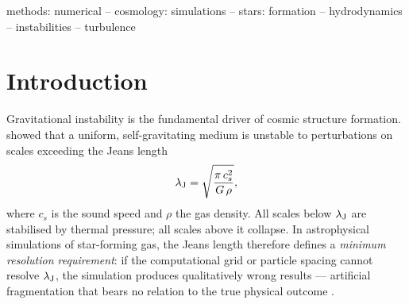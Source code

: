 \documentclass[fleqn,usenatbib]{mnras}
\newcommand{\lJ}{\lambda_{\rm J}}
\begin{document}
\begin{abstract}
$\Delta r_{\rm proper}$ throughout cosmic time by dynamically
adjusting the refinement threshold, smoothing the Poisson source in
transition levels, and raising the Jeans pressure floor to match the
effective resolution.  In a $1024^3$ zoom-in test, FPR reduces peak
memory usage from $>$99\,per\,cent (OOM crash at $z\approx2.5$) to
$\sim$54\,per\,cent while matching the observed star formation rate
density to within 30\,per\,cent of the \citet{MadauDickinson2014}
fit, demonstrating that FPR enables cosmological runs to reach $z=0$
without memory overflow.
Finally, we identify a secondary
failure mode when the holdback is disabled --- negative internal energy
from the total-energy formulation in post-feedback flows --- and
introduce a minimal \emph{eEOS polytropic energy floor} that prevents
CFL time-step collapse without altering the thermodynamics of diffuse
gas.
\end{abstract}

\begin{keywords}
methods: numerical -- cosmology: simulations --
stars: formation -- hydrodynamics -- instabilities --
turbulence
\end{keywords}


\section{Introduction}
\label{sec:intro}

Gravitational instability is the fundamental driver of cosmic
structure formation.  \citet{Jeans1902} showed that a uniform,
self-gravitating medium is unstable to perturbations on scales
exceeding the Jeans length
\begin{equation}
  \lJ = \sqrt{\frac{\pi\,c_s^2}{G\,\rho}},
  \label{eq:jeans_intro}
\end{equation}
where $c_s$ is the sound speed and $\rho$ the gas density.  All
scales below $\lJ$ are stabilised by thermal pressure; all scales
above it collapse.  In astrophysical simulations of star-forming gas,
the Jeans length therefore defines a \emph{minimum resolution
requirement}: if the computational grid or particle spacing cannot
resolve $\lJ$, the simulation produces qualitatively wrong results
--- artificial fragmentation that bears no relation to the true
physical outcome \citep{Truelove1997, Bate1997}.
\end{document}
